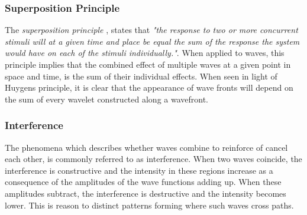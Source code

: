\documentclass[10pt, nofootinbib, twocolumn]{revtex4-1}
\begin{document}
\subsubsection{Superposition Principle}
The \textit{superposition principle} \cite{oscillations}, states that \textit{"the response to two or more concurrent stimuli will at a given time and place be equal the sum of the response the system would have on each of the stimuli individually."}. When applied to waves, this principle implies that the combined effect of multiple waves at a given point in space and time, is the sum of their individual effects. When seen in light of Huygens principle, it is clear that the appearance of wave fronts will depend on the sum of every wavelet constructed along a wavefront. 


\subsubsection{Interference}
The phenomena which describes whether waves combine to reinforce of cancel each other, is commonly referred to as interference. When two waves coincide, the interference is constructive and the intensity in these regions increase as a consequence of the amplitudes of the wave functions adding up. When these amplitudes subtract, the interference is destructive and the intensity becomes lower. This is reason to distinct patterns forming where such waves cross paths. 


\newpage
\end{document}
